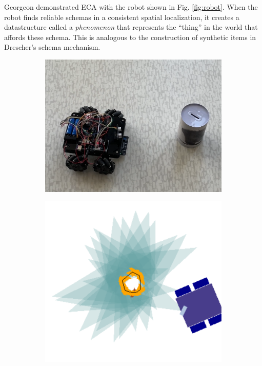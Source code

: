 \documentclass[runningheads]{llncs}
\begin{document}
Georgeon \cite{georgeon_artificial_2024} demonstrated ECA with the robot shown in Fig. \ref{fig:robot}.
When the robot finds reliable schemas in a consistent spatial localization, it creates a datastructure called a \textit{phenomenon} that represents the ``thing'' in the world that affords these schema.
This is analogous to the construction of synthetic items in Drescher's schema mechanism.

\begin{figure}[htbp]
	\centering
	\begin{subfigure}{0.49\textwidth}
		\centering
		\includegraphics[width=\linewidth]{Figure_petitcat.png}
		\label{fig:first}
	\end{subfigure}
	\hfill
	\begin{subfigure}{0.49\textwidth}
		\centering
		\includegraphics[width=\linewidth]{Figure_phenomenon.png}

\end{subfigure}
\end{figure}
\end{document}
